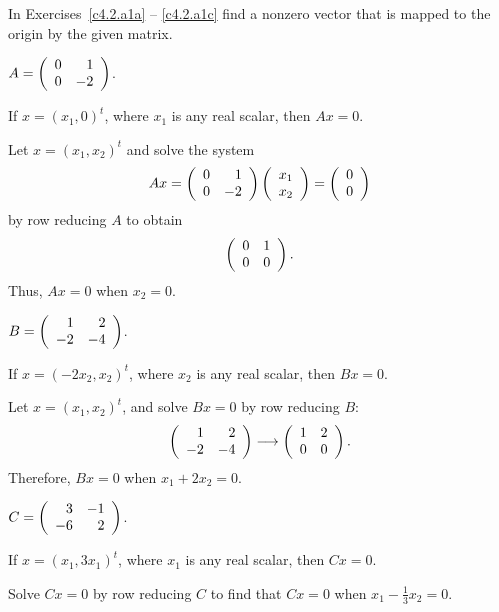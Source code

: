 \documentclass{ximera}
\begin{document}
\TEXER

\noindent In Exercises~\ref{c4.2.a1a} -- \ref{c4.2.a1c} find a nonzero
vector that is mapped to the origin by the given matrix.
\begin{exercise} \label{c4.2.a1a}
$A=\left(\begin{array}{rr} 0 & 1\\ 0 &-2\end{array}\right)$.

\begin{solution}

\ans If $x = (x_1,0)^t$, where $x_1$ is any real scalar, then $Ax = 0$.

\soln Let $x = (x_1,x_2)^t$ and solve the system
\[
Ax = \left(\begin{array}{rr} 0 & 1\\ 0 &-2\end{array}\right)\left(\begin{array}{r} x_1 \\ x_2\end{array}\right) = \left(\begin{array}{r} 0 \\ 0\end{array}\right)
\]
by row reducing $A$ to obtain
\[
\left(\begin{array}{rr} 0 & 1\\ 0 &0\end{array}\right).
\]
Thus, $Ax = 0$ when $x_2 = 0$.

\end{solution}
\end{exercise}
\begin{exercise} \label{c4.2.a1b}
$B=\left(\begin{array}{rr} 1 & 2\\ -2 &-4\end{array}\right)$.

\begin{solution}
\ans  If $x = (-2x_2,x_2)^t$, where $x_2$ is any real
scalar, then $Bx = 0$.

\soln Let $x = (x_1,x_2)^t$, and solve $Bx = 0$ by row reducing $B$:
\[
\left(\begin{array}{rr} 1 & 2\\ -2 &-4\end{array}\right) \longrightarrow \left(\begin{array}{rr} 1 & 2\\ 0 &0\end{array}\right).
\]
Therefore, $Bx = 0$ when $x_1 + 2x_2 = 0$.

\end{solution}
\end{exercise}
\begin{exercise} \label{c4.2.a1c}
$C=\left(\begin{array}{rr} 3 & -1\\ -6 &2\end{array}\right)$.

\begin{solution}

\ans If $x = (x_1,3x_1)^t$, where $x_1$ is any real scalar, then $Cx = 0$.

\soln Solve $Cx = 0$ by row reducing $C$ to find that $Cx = 0$ when
$x_1 - \frac{1}{3}x_2 = 0$.

\end{solution}
\end{exercise}
\end{document}
